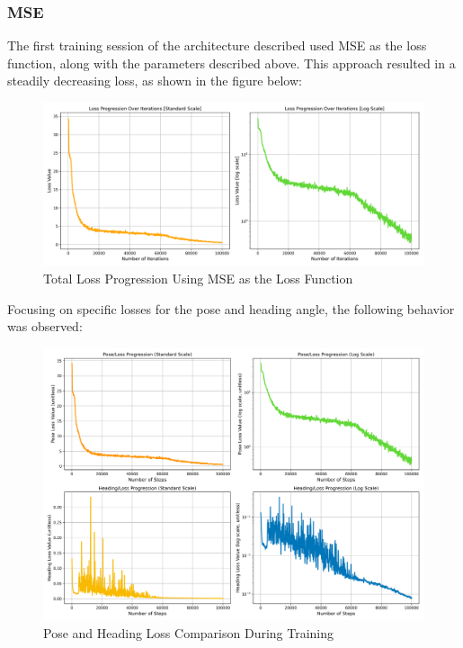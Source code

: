 \subsubsection*{MSE}
The first training session of the architecture described used MSE as the loss function, along with the parameters described above. This approach resulted in a steadily decreasing loss, as shown in the figure below:
\begin{figure}[H]
    \centering
    \includegraphics[width=1\linewidth]{LateX//figs/loss_total_mse_progression_comparison.png}
    \caption{Total Loss Progression Using MSE as the Loss Function}
    \label{fig:mse-loss-progression}
\end{figure}

Focusing on specific losses for the pose and heading angle, the following behavior was observed:
\begin{figure}[H]
    \centering
    \includegraphics[width=1\linewidth]{LateX//figs/mse_pose_heading_loss_comparison.png}
    \caption{Pose and Heading Loss Comparison During Training}
    \label{fig:pose-heading-loss}
\end{figure}

